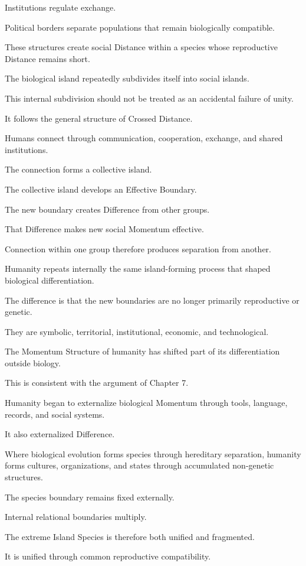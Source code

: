 Institutions regulate exchange.

Political borders separate populations that remain biologically compatible.

These structures create social Distance within a species whose reproductive Distance remains short.

The biological island repeatedly subdivides itself into social islands.

This internal subdivision should not be treated as an accidental failure of unity.

It follows the general structure of Crossed Distance.

Humans connect through communication, cooperation, exchange, and shared institutions.

The connection forms a collective island.

The collective island develops an Effective Boundary.

The new boundary creates Difference from other groups.

That Difference makes new social Momentum effective.

Connection within one group therefore produces separation from another.

Humanity repeats internally the same island-forming process that shaped biological differentiation.

The difference is that the new boundaries are no longer primarily reproductive or genetic.

They are symbolic, territorial, institutional, economic, and technological.

The Momentum Structure of humanity has shifted part of its differentiation outside biology.

This is consistent with the argument of Chapter 7.

Humanity began to externalize biological Momentum through tools, language, records, and social systems.

It also externalized Difference.

Where biological evolution forms species through hereditary separation, humanity forms cultures, organizations, and states through accumulated non-genetic structures.

The species boundary remains fixed externally.

Internal relational boundaries multiply.

The extreme Island Species is therefore both unified and fragmented.

It is unified through common reproductive compatibility.

